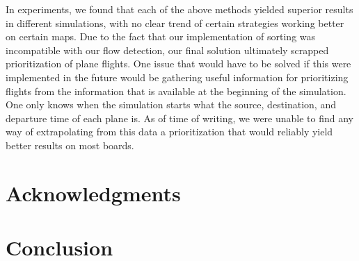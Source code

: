 \documentclass[10pt]{article}
\begin{document}
In experiments, we found that each of the above methods yielded superior results in different
simulations, with no clear trend of certain strategies working better on certain maps. Due to the
fact that our implementation of sorting was incompatible with our flow detection, our final solution
ultimately scrapped prioritization of plane flights. One issue that would have to be solved if this
were implemented in the future would be gathering useful information for prioritizing flights from
the information that is available at the beginning of the simulation. One only knows when the simulation
starts what the source, destination, and departure time of each plane is. As of time of writing, we 
were unable to find any way of extrapolating from this data a prioritization that would reliably yield
better results on most boards.

\newpage
\section{Acknowledgments}

\newpage
\section{Conclusion}
  
\end{document}
